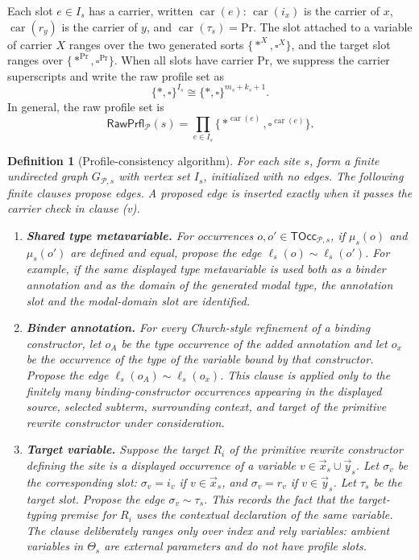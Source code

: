 \documentclass[11pt]{article}
\newcommand{\Proc}{\mathrm{Pr}}
\newcommand{\RawPrfl}{\mathsf{RawPrfl}}
\newcommand{\TOcc}{\mathsf{TOcc}}
\newtheorem{definition}{Definition}[section]
\begin{document}
Each slot \(e\in I_s\) has a carrier, written \(\operatorname{car}(e)\):
\(\operatorname{car}(i_x)\) is the carrier of \(x\),
\(\operatorname{car}(r_y)\) is the carrier of \(y\), and
\(\operatorname{car}(\tau_s)=\Proc\).  The slot attached to a variable of carrier
\(X\) ranges over the two generated sorts \(\{\ast^X,\square^X\}\), and the
target slot ranges over \(\{\ast^\Proc,\square^\Proc\}\).  When all slots have
carrier \(\Proc\), we suppress the carrier superscripts and write the raw profile
set as
\[
  \{\ast,\square\}^{I_s}
  \cong
  \{\ast,\square\}^{m_s+k_s+1}.
\]
In general, the raw profile set is
\[
  \RawPrfl_{\mathcal{P}}(s)
  =
  \prod_{e\in I_s}\{\ast^{\operatorname{car}(e)},
                    \square^{\operatorname{car}(e)}\}.
\]

\begin{definition}[Profile-consistency algorithm]
For each site \(s\), form a finite undirected graph \(G_{\mathcal{P},s}\) with
vertex set \(I_s\), initialized with no edges.  The following finite clauses
propose edges.  A proposed edge is inserted exactly when it passes the carrier
check in clause \textup{(v)}.

\begin{enumerate}[label=\textup{(\roman*)}]
  \item \textbf{Shared type metavariable.} For occurrences
  \(o,o'\in\TOcc_{\mathcal{P},s}\), if \(\mu_s(o)\) and \(\mu_s(o')\) are defined
  and equal, propose the edge \(\ell_s(o)\sim\ell_s(o')\).  For example, if the
  same displayed type metavariable is used both as a binder annotation and as the
  domain of the generated modal type, the annotation slot and the modal-domain
  slot are identified.

  \item \textbf{Binder annotation.} For every Church-style refinement of a
  binding constructor, let \(o_A\) be the type occurrence of the added annotation
  and let \(o_x\) be the occurrence of the type of the variable bound by that
  constructor.  Propose the edge \(\ell_s(o_A)\sim\ell_s(o_x)\).  This clause is
  applied only to the finitely many binding-constructor occurrences appearing in
  the displayed source, selected subterm, surrounding context, and target of the
  primitive rewrite constructor under consideration.

  \item \textbf{Target variable.} Suppose the target \(R_i\) of the primitive
  rewrite constructor defining the site is a displayed occurrence of a variable
  \(v\in\vec{x}_s\cup\vec{y}_s\).  Let \(\sigma_v\) be the corresponding slot:
  \(\sigma_v=i_v\) if \(v\in\vec{x}_s\), and \(\sigma_v=r_v\) if
  \(v\in\vec{y}_s\).  Let \(\tau_s\) be the target slot.  Propose the edge
  \(\sigma_v\sim\tau_s\).  This records the fact that the
  target-typing premise for \(R_i\) uses the contextual declaration of the same
  variable.  The clause deliberately ranges only over index and rely variables:
  ambient variables in \(\Theta_s\) are external parameters and do not have
  profile slots.


\end{enumerate}
\end{definition}
\end{document}
